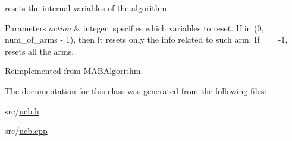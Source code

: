 resets the internal variables of the algorithm 


\begin{DoxyParams}{Parameters}
{\em action} & integer, specifies which variables to reset. If in (0, num\+\_\+of\+\_\+arms -\/ 1), then it resets only the info related to such arm. If == -\/1, resets all the arms. \\
\hline
\end{DoxyParams}


Reimplemented from \mbox{\hyperlink{class_m_a_b_algorithm_ad5761cee0b0e3421d1f043dbcc0b5f85}{M\+A\+B\+Algorithm}}.



The documentation for this class was generated from the following files\+:\begin{DoxyCompactItemize}
\item 
src/\mbox{\hyperlink{ucb_8h}{ucb.\+h}}\item 
src/\mbox{\hyperlink{ucb_8cpp}{ucb.\+cpp}}\end{DoxyCompactItemize}
